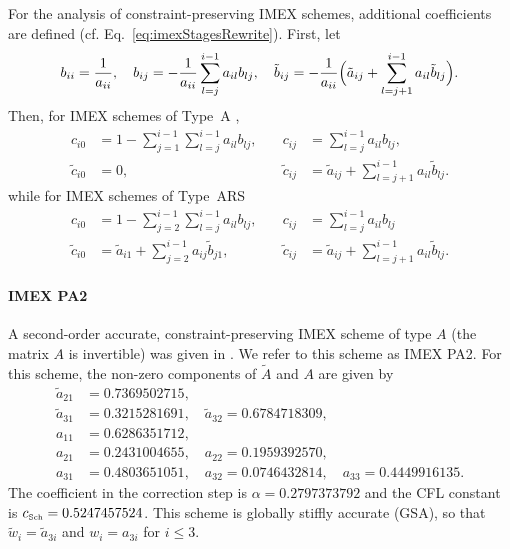 For the analysis of constraint-preserving IMEX schemes, additional coefficients are defined \cite{hu_etal_2018} (cf. Eq.~\eqref{eq:imexStagesRewrite}).  
First, let
\begin{equation}
  b_{ii} = \frac{1}{a_{ii}}, \quad
  b_{ij} = -\frac{1}{a_{ii}}\sum_{l=j}^{i-1}a_{il}b_{lj}, \quad
  \tilde{b}_{ij} = -\frac{1}{a_{ii}}\Big(\tilde{a}_{ij}+\sum_{l=j+1}^{i-1}a_{il}\tilde{b}_{lj}\Big).  
\end{equation}
Then, for IMEX schemes of Type~A \cite{dimarcoPareschi2013},
\begin{equation}
  \begin{aligned}
    c_{i0} &= 1-\sum_{j=1}^{i-1}\sum_{l=j}^{i-1}a_{il}b_{lj}, \quad &
    c_{ij} &= \sum_{l=j}^{i-1}a_{il}b_{lj}, \\
    \tilde{c}_{i0} &= 0, \quad &
    \tilde{c}_{ij} &= \tilde{a}_{ij} + \sum_{l=j+1}^{i-1}a_{il}\tilde{b}_{lj}.
  \end{aligned}
  \label{eq:positivityCoefficientsA}
\end{equation}
while for IMEX schemes of Type~ARS \cite{ascher_etal_1997}
\begin{equation}
  \begin{aligned}
    c_{i0} &= 1-\sum_{j=2}^{i-1}\sum_{l=j}^{i-1}a_{il}b_{lj}, \quad &
    c_{ij} &= \sum_{l=j}^{i-1}a_{il}b_{lj} \\
    \tilde{c}_{i0} &= \tilde{a}_{i1}+\sum_{j=2}^{i-1}a_{ij}\tilde{b}_{j1}, \quad &
    \tilde{c}_{ij} &= \tilde{a}_{ij}+\sum_{l=j+1}^{i-1}a_{il}\tilde{b}_{lj}.  
  \end{aligned}
  \label{eq:positivityCoefficientsARS}
\end{equation}

\paragraph{IMEX PA2}

A second-order accurate, constraint-preserving IMEX scheme of type $A$ (the matrix $A$ is invertible) was given in \cite{hu_etal_2018}.  
We refer to this scheme as IMEX PA2.  
For this scheme, the non-zero components of $\tilde{A}$ and $A$ are given by
\begin{align*}
  \tilde{a}_{21} &= 0.7369502715, \\
  \tilde{a}_{31} &= 0.3215281691, \quad \tilde{a}_{32} = 0.6784718309, \\
  a_{11} &= 0.6286351712, \\
  a_{21} &= 0.2431004655, \quad a_{22} = 0.1959392570, \\
  a_{31} &= 0.4803651051, \quad a_{32} = 0.0746432814, \quad a_{33} = 0.4449916135. 
\end{align*}
The coefficient in the correction step is $\alpha = 0.2797373792$ and the CFL constant is $c_{\mbox{\tiny Sch}} = 0.5247457524$.
This scheme is globally stiffly accurate (GSA), so that $\tilde{w}_{i}=\tilde{a}_{3i}$ and $w_{i}=a_{3i}$ for $i\le3$.

